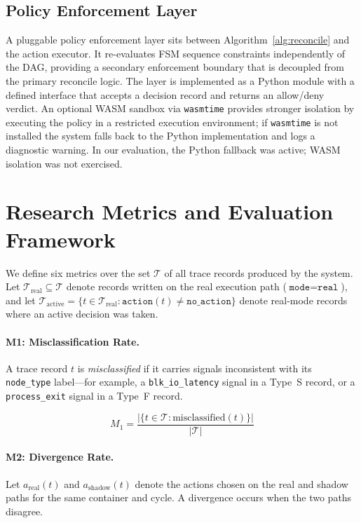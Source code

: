 \documentclass[runningheads]{llncs}
\begin{document}
\subsection{Policy Enforcement Layer}

A pluggable policy enforcement layer sits between Algorithm~\ref{alg:reconcile}
and the action executor. It re-evaluates FSM sequence constraints
independently of the DAG, providing a secondary enforcement boundary
that is decoupled from the primary reconcile logic. The layer is
implemented as a Python module with a defined interface that accepts
a decision record and returns an allow/deny verdict. An optional WASM
sandbox via \texttt{wasmtime} provides stronger isolation by executing
the policy in a restricted execution environment; if \texttt{wasmtime}
is not installed the system falls back to the Python implementation
and logs a diagnostic warning. In our evaluation, the Python fallback
was active; WASM isolation was not exercised.

\section{Research Metrics and Evaluation Framework}
\label{sec:metrics}

We define six metrics over the set $\mathcal{T}$ of all trace records
produced by the system. Let $\mathcal{T}_{\mathrm{real}} \subseteq
\mathcal{T}$ denote records written on the real execution path
($\texttt{mode} = \texttt{real}$), and let
$\mathcal{T}_{\mathrm{active}} = \{t \in \mathcal{T}_{\mathrm{real}} :
\texttt{action}(t) \neq \texttt{no\_action}\}$ denote real-mode records
where an active decision was taken.

\paragraph{M1: Misclassification Rate.}
A trace record $t$ is \textit{misclassified} if it carries signals
inconsistent with its \texttt{node\_type} label---for example, a
\texttt{blk\_io\_latency} signal in a Type~S record, or a
\texttt{process\_exit} signal in a Type~F record.

\begin{equation}
M_1 = \frac{|\{t \in \mathcal{T} : \mathrm{misclassified}(t)\}|}{|\mathcal{T}|}
\label{eq:m1}
\end{equation}

\paragraph{M2: Divergence Rate.}
Let $a_{\mathrm{real}}(t)$ and $a_{\mathrm{shadow}}(t)$ denote the
actions chosen on the real and shadow paths for the same container and
cycle. A divergence occurs when the two paths disagree.
\end{document}
